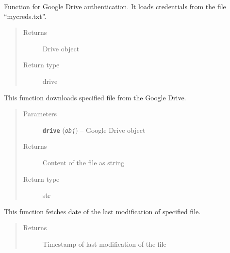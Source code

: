 \documentclass[letterpaper,10pt,english,openany]{sphinxmanual}
\begin{document}
\begin{fulllineitems}
\begin{fulllineitems}
\label{rpicameramon:rpicameramon.filemanipulation.ConfFileDownloader.auth}
Function for Google Drive authentication. It loads credentials from the
file ``mycreds.txt''.
\begin{quote}\begin{description}
\item[{Returns}] \leavevmode
Drive object

\item[{Return type}] \leavevmode
drive

\end{description}\end{quote}

\end{fulllineitems}


\begin{fulllineitems}
\label{rpicameramon:rpicameramon.filemanipulation.ConfFileDownloader.download_file}
This function downloads specified file from the Google Drive.
\begin{quote}\begin{description}
\item[{Parameters}] \leavevmode
\textbf{\texttt{drive}} (\emph{\texttt{obj}}) -- Google Drive object

\item[{Returns}] \leavevmode
Content of the file as string

\item[{Return type}] \leavevmode
str

\end{description}\end{quote}

\end{fulllineitems}


\begin{fulllineitems}
\label{rpicameramon:rpicameramon.filemanipulation.ConfFileDownloader.get_timestamp}
This function fetches date of the last modification of specified file.
\begin{quote}\begin{description}
\item[{Returns}] \leavevmode
Timestamp of last modification of the file


\end{description}
\end{quote}
\end{fulllineitems}
\end{fulllineitems}
\end{document}
